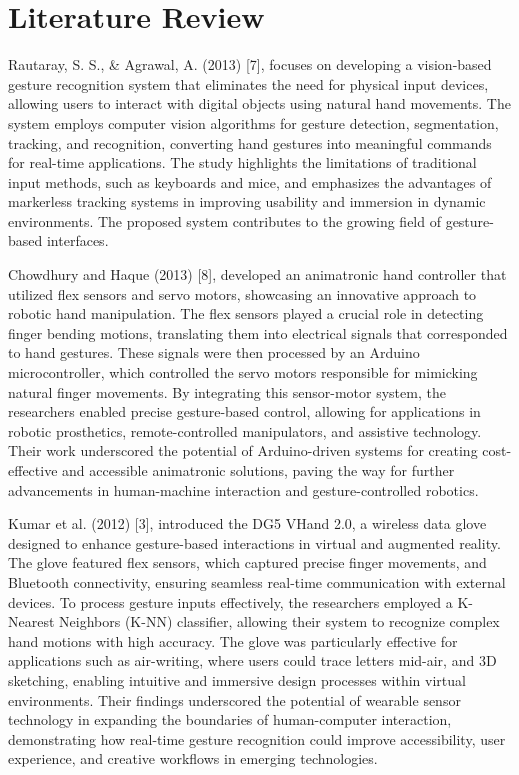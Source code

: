 \section{Literature Review}

Rautaray, S. S., \& Agrawal, A. (2013) [7], focuses on developing a vision-based gesture recognition system that eliminates the need for physical input devices, allowing users to interact with digital objects using natural hand movements. The system employs computer vision algorithms for gesture detection, segmentation, tracking, and recognition, converting hand gestures into meaningful commands for real-time applications. The study highlights the limitations of traditional input methods, such as keyboards and mice, and emphasizes the advantages of markerless tracking systems in improving usability and immersion in dynamic environments. The proposed system contributes to the growing field of gesture-based interfaces.

Chowdhury and Haque (2013) [8], developed an animatronic hand controller that utilized flex sensors and servo motors, showcasing an innovative approach to robotic hand manipulation. The flex sensors played a crucial role in detecting finger bending motions, translating them into electrical signals that corresponded to hand gestures. These signals were then processed by an Arduino microcontroller, which controlled the servo motors responsible for mimicking natural finger movements. By integrating this sensor-motor system, the researchers enabled precise gesture-based control, allowing for applications in robotic prosthetics, remote-controlled manipulators, and assistive technology. Their work underscored the potential of Arduino-driven systems for creating cost-effective and accessible animatronic solutions, paving the way for further advancements in human-machine interaction and gesture-controlled robotics.

Kumar et al. (2012) [3], introduced the DG5 VHand 2.0, a wireless data glove designed to enhance gesture-based interactions in virtual and augmented reality. The glove featured flex sensors, which captured precise finger movements, and Bluetooth connectivity, ensuring seamless real-time communication with external devices. To process gesture inputs effectively, the researchers employed a K-Nearest Neighbors (K-NN) classifier, allowing their system to recognize complex hand motions with high accuracy. The glove was particularly effective for applications such as air-writing, where users could trace letters mid-air, and 3D sketching, enabling intuitive and immersive design processes within virtual environments. Their findings underscored the potential of wearable sensor technology in expanding the boundaries of human-computer interaction, demonstrating how real-time gesture recognition could improve accessibility, user experience, and creative workflows in emerging technologies.

